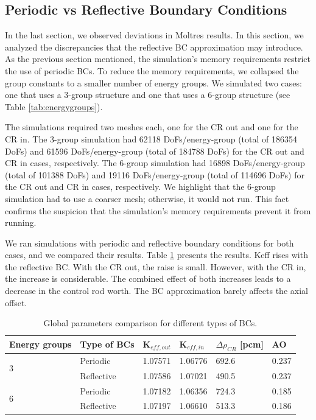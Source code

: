 \subsection{Periodic vs Reflective Boundary Conditions}
\label{sec:bench-bcs}

In the last section, we observed deviations in Moltres results.
In this section, we analyzed the discrepancies that the reflective \gls{BC} approximation may introduce.
As the previous section mentioned, the simulation's memory requirements restrict the use of periodic BCs.
To reduce the memory requirements, we collapsed the group constants to a smaller number of energy groups.
We simulated two cases: one that uses a 3-group structure and one that uses a 6-group structure (see Table \ref{tab:energygroups}).

The simulations required two meshes each, one for the CR out and one for the CR in.
The 3-group simulation had 62118 DoFs/energy-group (total of 186354 DoFs) and 61596 DoFs/energy-group (total of 184788 DoFs) for the CR out and CR in cases, respectively.
The 6-group simulation had 16898 DoFs/energy-group (total of 101388 DoFs) and 19116 DoFs/energy-group (total of 114696 DoFs) for the CR out and CR in cases, respectively.
We highlight that the 6-group simulation had to use a coarser mesh; otherwise, it would not run.
This fact confirms the suspicion that the simulation's memory requirements prevent it from running.

We ran simulations with periodic and reflective boundary conditions for both cases, and we compared their results.
Table \ref{tab:benchmark-bc} presents the results.
Keff rises with the reflective BC.
With the CR out, the raise is small.
However, with the CR in, the increase is considerable.
The combined effect of both increases leads to a decrease in the control rod worth.
The BC approximation barely affects the axial offset.

\begin{table}[htbp!]
  \centering
  \caption{Global parameters comparison for different types of BCs.}
  \begin{tabular}{l|l|l|l|l|l}
  \toprule
  Energy groups       & Type of BCs & K$_{eff, out}$ & K$_{eff, in}$ & $\Delta \rho_{CR}$ [pcm] & AO \\
  \midrule
  \multirow{2}{*}{3}  & Periodic     & 1.07571		& 1.06776		& 692.6		& 0.237		\\
                      & Reflective   & 1.07586	  & 1.07021   & 490.5		& 0.237	  \\ \hline
  \multirow{2}{*}{6}  & Periodic     & 1.07182		& 1.06356		& 724.3	  & 0.185  	\\
                      & Reflective   & 1.07197   	& 1.06610 	& 513.3		& 0.186		\\  
  \bottomrule
  \end{tabular}
  \label{tab:benchmark-bc}
\end{table}


